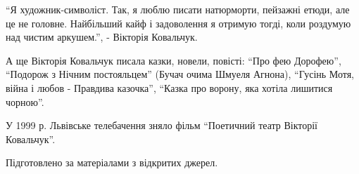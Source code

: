 \enquote{Я художник-символіст. Так, я люблю писати натюрморти, пейзажні етюди, але це
не головне. Найбільший кайф і задоволення я отримую тогді, коли роздумую над
чистим аркушем.}, - Вікторія Ковальчук.

А ще Вікторія Ковальчук писала казки, новели, повісті: \enquote{Про фею Дорофею},
\enquote{Подорож з Нічним постояльцем} (Бучач очима Шмуеля Агнона), \enquote{Гусінь Мотя, війна
і любов - Правдива казочка}, \enquote{Казка про ворону, яка хотіла лишитися чорною}.

У 1999 р. Львівське телебачення зняло фільм \enquote{Поетичний театр Вікторії Ковальчук}.

Підготовлено за матеріалами з відкритих джерел.
